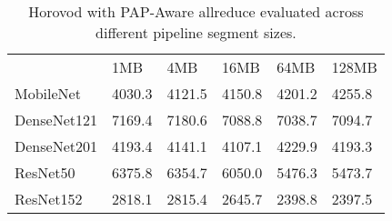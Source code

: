 \begin{table}
    \centering
    \caption{Horovod with PAP-Aware allreduce evaluated across different pipeline segment sizes.}
    \begin{tabular}{llllll}
                & 1MB    & 4MB    & 16MB   & 64MB   & 128MB  \\
    MobileNet   & 4030.3 & 4121.5 & 4150.8 & 4201.2 & 4255.8 \\
    DenseNet121 & 7169.4 & 7180.6 & 7088.8 & 7038.7 & 7094.7 \\
    DenseNet201 & 4193.4 & 4141.1 & 4107.1 & 4229.9 & 4193.3 \\
    ResNet50    & 6375.8 & 6354.7 & 6050.0 & 5476.3 & 5473.7 \\
    ResNet152   & 2818.1 & 2815.4 & 2645.7 & 2398.8 & 2397.5 \\
    \end{tabular}
    \label{tbl:pap_hvd_narval_shift_seg}
\end{table}